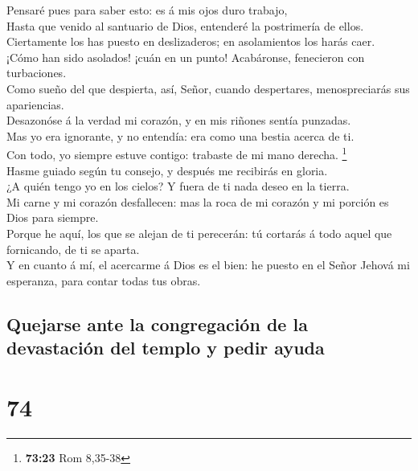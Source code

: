  Pensaré pues para saber esto: es á mis ojos duro
trabajo,\\
 Hasta que venido al santuario de Dios, entenderé la
postrimería de ellos.\\
 Ciertamente los has puesto en deslizaderos; en
asolamientos los harás caer.\\
 ¡Cómo han sido asolados! ¡cuán en un punto! Acabáronse,
fenecieron con turbaciones.\\
 Como sueño del que despierta, así, Señor, cuando
despertares, menospreciarás sus apariencias.\\
 Desazonóse á la verdad mi corazón, y en mis riñones sentía
punzadas.\\
 Mas yo era ignorante, y no entendía: era como una bestia
acerca de ti.\\
 Con todo, yo siempre estuve contigo: trabaste de mi mano
derecha. \footnote{\textbf{73:23} Rom 8,35-38}\\
 Hasme guiado según tu consejo, y después me recibirás en
gloria.\\
 ¿A quién tengo yo en los cielos? Y fuera de ti nada deseo
en la tierra.\\
 Mi carne y mi corazón desfallecen: mas la roca de mi
corazón y mi porción es Dios para siempre.\\
 Porque he aquí, los que se alejan de ti perecerán: tú
cortarás á todo aquel que fornicando, de ti se aparta.\\
 Y en cuanto á mí, el acercarme á Dios es el bien: he
puesto en el Señor Jehová mi esperanza, para contar todas tus obras.

\hypertarget{quejarse-ante-la-congregaciuxf3n-de-la-devastaciuxf3n-del-templo-y-pedir-ayuda}{%
\subsection{Quejarse ante la congregación de la devastación del templo y
pedir
ayuda}\label{quejarse-ante-la-congregaciuxf3n-de-la-devastaciuxf3n-del-templo-y-pedir-ayuda}}

\hypertarget{section-73}{%
\section{74}\label{section-73}}

